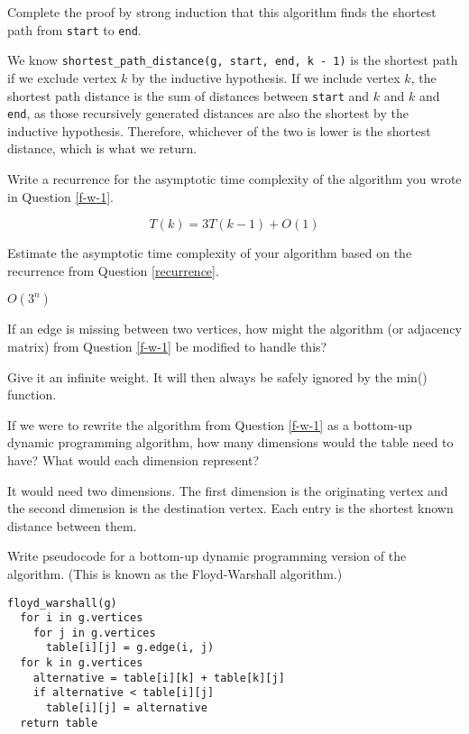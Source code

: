 \documentclass{tufte-handout}
\begin{document}
\begin{questions}
\item Complete the proof by strong induction that this algorithm finds the shortest path from \verb|start| to \verb|end|.

{\color{red} We know \verb|shortest_path_distance(g, start, end, k - 1)| is the shortest path if we exclude vertex $k$ by the inductive hypothesis. If we include vertex $k$, the shortest path distance is the sum of distances between \verb|start| and $k$ and $k$ and \verb|end|, as those recursively generated distances are also the shortest by the inductive hypothesis. Therefore, whichever of the two is lower is the shortest distance, which is what we return.
}

\item Write a recurrence for the asymptotic time complexity of the algorithm you wrote in Question \ref{f-w-1}. \label{recurrence}

{\color{red} \[T(k) = 3T(k-1) + O(1) \]}

\item Estimate the asymptotic time complexity of your algorithm based on the recurrence from Question \ref{recurrence}.

{\color{red} $O(3^n)$}

\item If an edge is missing between two vertices, how might the algorithm (or adjacency matrix) from Question \ref{f-w-1} be modified to handle this?

{\color{red} Give it an infinite weight. It will then always be safely ignored by the min() function.}

\item If we were to rewrite the algorithm from Question \ref{f-w-1} as a bottom-up dynamic programming algorithm, how many dimensions would the table need to have? What would each dimension represent?

{\color{red} It would need two dimensions. The first dimension is the originating vertex and the second dimension is the destination vertex. Each entry is the shortest known distance between them.}

\item Write pseudocode for a bottom-up dynamic programming version of the algorithm. (This is known as the Floyd-Warshall algorithm.) \label{f-w-2}

{\color{red}
\begin{verbatim}
floyd_warshall(g)
  for i in g.vertices
    for j in g.vertices
      table[i][j] = g.edge(i, j)
  for k in g.vertices
    alternative = table[i][k] + table[k][j]
    if alternative < table[i][j]
      table[i][j] = alternative
  return table
\end{verbatim}
}


\end{questions}
\end{document}

